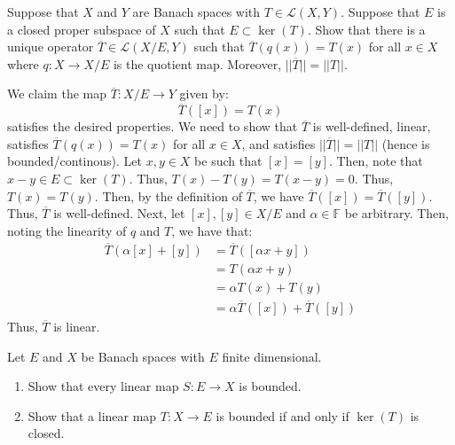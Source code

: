 \documentclass[12pt]{article}
\begin{document}
\begin{problem}{31}
    Suppose that $X$ and $Y$ are Banach spaces with $T \in \mathcal{L}(X, Y)$. Suppose that $E$ is a closed proper subspace of $X$ such that $E \subset \ker(T)$. Show that there is a unique operator $\overline{T} \in \mathcal{L}(X/E, Y)$ such that $\overline{T}(q(x)) = T(x)$ for all $x \in X$ where $q: X \to X/E$ is the quotient map. Moreover, $||\overline{T}|| = ||T||$.
\end{problem}
\begin{solution} 
    We claim the map $\overline{T}: X/E \to Y$ given by: 
    \[ \overline{T}([x]) = T(x)\]
    satisfies the desired properties. We need to show that $\overline{T}$ is well-defined, linear, satisfies $\overline{T}(q(x)) = T(x)$ for all $x \in X$, and satisfies $||\overline{T}|| = ||T||$ (hence is bounded/continous). \bbni
    Let $x, y \in X$ be such that $[x] = [y]$. Then, note that $x - y \in E \subset \ker(T)$. Thus, $T(x)-T(y) = T(x-y) = 0$. Thus, $T(x) = T(y)$. Then, by the definition of $\overline{T}$, we have $\overline{T}([x]) = \overline{T}([y])$. Thus, $\overline{T}$ is well-defined. \bbni
    Next, let $[x], [y] \in X/E$ and $\alpha \in \mathbb{F}$ be arbitrary. Then, noting the linearity of $q$ and $T$, we have that:
    \begin{align*}
        \overline{T}(\alpha[x] + [y]) &= \overline{T}([\alpha x + y]) \\
        &= T(\alpha x + y) \\
        &= \alpha T(x) + T(y) \\
        &= \alpha \overline{T}([x]) + \overline{T}([y])
    \end{align*}
    Thus, $\overline{T}$ is linear. \bbni
    
\end{solution}
\newpage 


\begin{problem}{33}
    Let $E$ and $X$ be Banach spaces with $E$ finite dimensional. 
    \begin{enumerate}
        \item Show that every linear map $S: E \to X$ is bounded. 
        \item Show that a linear map $T: X \to E$ is bounded if and only if $\ker(T)$ is closed. 
    \end{enumerate}
\end{problem}
\begin{solution} 

\end{solution}
\newpage 
\end{document}
